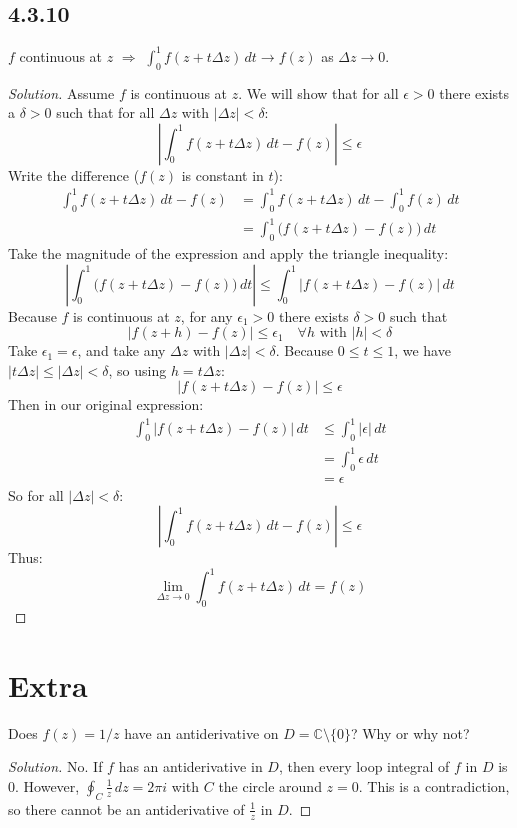 \documentclass{article}
\newenvironment{solution}{
\begin{proof}[Solution]}{
\end{proof}}
\begin{document}
\subsection*{4.3.10}
$f$ continuous at $z$ $\Rightarrow$ $\int_0^1 f(z + t\Delta z)\,dt \to f(z)$ as $\Delta z \to 0$.
\begin{solution}
  Assume $f$ is continuous at $z$.
  We will show that for all $\epsilon > 0$ there exists a $\delta > 0$ such that for all
  $\Delta z$ with $|\Delta z| < \delta$:
  \[
    \left| \int_0^1 f(z + t\Delta z)\,dt - f(z) \right| \leq \epsilon
  \]
  Write the difference ($f(z)$ is constant in $t$):
  \begin{align*}
    \int_{0}^{1} f(z+t\Delta z)\,dt - f(z)
    & = \int_{0}^{1} f(z+t\Delta z)\,dt - \int_{0}^{1} f(z)\,dt \\
    & = \int_0^1 \big( f(z + t\Delta z) - f(z) \big)\,dt
  \end{align*}
  Take the magnitude of the expression and apply the triangle inequality:
  \[
    \left| \int_0^1 \big( f(z + t\Delta z) - f(z) \big)\,dt \right|
    \leq \int_0^1 | f(z + t\Delta z) - f(z) |\,dt
  \]
  Because $f$ is continuous at $z$, for any $\epsilon_1 > 0$ there exists $\delta > 0$ such that
  \[
    | f(z + h) - f(z) | \leq \epsilon_1 \quad \forall h \text{ with } |h| < \delta
  \]
  Take $\epsilon_1 = \epsilon$, and take any $\Delta z$ with $|\Delta z| < \delta$.
  Because $0 \leq t \leq 1$, we have $|t\Delta z| \leq |\Delta z| < \delta$, so using
  $h = t\Delta z$:
  \[
    | f(z + t\Delta z) - f(z) | \leq \epsilon
  \]
  Then in our original expression:
  \begin{align*}
    \int_0^1 | f(z + t\Delta z) - f(z) |\,dt
    & \leq \int_0^1 |\epsilon|\,dt \\
    & = \int_0^1 \epsilon\,dt \\
    & = \epsilon
  \end{align*}
  So for all $|\Delta z| < \delta$:
  \[
    \left| \int_0^1 f(z + t\Delta z)\,dt - f(z) \right| \leq \epsilon
  \]
  Thus:
  \[
    \lim_{\Delta z\to0} \int_0^1 f(z + t\Delta z)\,dt = f(z)
  \]
\end{solution}

\section*{Extra}
Does $f(z) = 1/z$ have an antiderivative on $D = \mathbb{C} \setminus \{0\}$? Why or why not?
\begin{solution}
  No.
  If $f$ has an antiderivative in $D$, then every loop integral of $f$ in $D$ is $0$.
  However, $\oint_{C} \frac{1}{z}\,dz = 2\pi i$ with $C$ the circle around $z=0$.
  This is a contradiction, so there cannot be an antiderivative of $\frac{1}{z}$ in $D$.
\end{solution}
\end{document}
